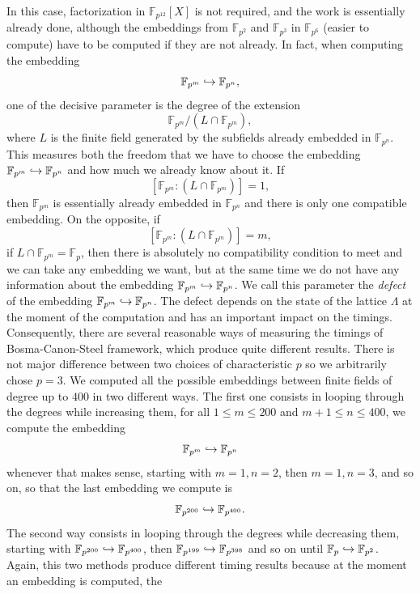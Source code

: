 In this case, factorization in $\mathbb{F}_{p^{12}}[X]$ is not required, and the
work is essentially already done, although the embeddings from
$\mathbb{F}_{p^{2}}$ and $\mathbb{F}_{p^{3}}$ in $\mathbb{F}_{p^{6}}$ (easier
to compute) have to be computed if they are not already.
In fact, when computing the embedding
\[
  \mathbb{F}_{p^{m}}\hookrightarrow\mathbb{F}_{p^{n}},
\]
one of the decisive parameter is the degree of the extension 
\[
  \mathbb{F}_{p^{m}}/(L\cap\mathbb{F}_{p^{m}}),
\]
where $L$ is the finite field generated by the subfields already embedded in
$\mathbb{F}_{p^{n}}$. This measures both the freedom that we have to choose the
embedding $\mathbb{F}_{p^{m}}\hookrightarrow\mathbb{F}_{p^{n}}$ and how much we already
know about it. If
\[
  \left[ \mathbb{F}_{p^{m}}:(L\cap\mathbb{F}_{p^{m}})\right]=1,
\]
then $\mathbb{F}_{p^{m}}$ is essentially already embedded in
$\mathbb{F}_{p^{n}}$ and there is only one compatible embedding. On the
opposite, if 
\[
  \left[ \mathbb{F}_{p^{m}}:(L\cap\mathbb{F}_{p^{m}})\right]=m,
\]
\ie if $L\cap\mathbb{F}_{p^{m}}=\mathbb{F}_p$, then there is absolutely no
compatibility condition to meet and we can take any embedding we want, but at
the same time we do not have any information about the embedding
$\mathbb{F}_{p^{m}}\hookrightarrow\mathbb{F}_{p^{n}}$. We call this parameter the
\emph{defect} of the embedding $\mathbb{F}_{p^{m}}\hookrightarrow\mathbb{F}_{p^{n}}$.
The defect depends on the state of the lattice $\Lambda$ at the moment of the
computation and has an important impact on the timings.
Consequently, there are several reasonable ways of measuring the timings
of Bosma-Canon-Steel framework, which produce quite different results.
There is not major difference between two choices of characteristic $p$ so we
arbitrarily chose $p=3$. We
computed all the possible embeddings between finite fields of degree up to $400$
in two different ways. The first one consists in looping through the degrees
while increasing them, \ie for all $1\leq m\leq200$ and $m+1 \leq n\leq 400$, we
compute the embedding 
\[
  \mathbb{F}_{p^{m}}\hookrightarrow \mathbb{F}_{p^{n}}
\]
whenever that makes sense, starting with $m=1, n=2$, then $m=1, n=3$, and so on, so
that the last embedding we compute is 
\[
  \mathbb{F}_{p^{200}}\hookrightarrow\mathbb{F}_{p^{400}}.
\]
The second way consists in looping through the
degrees while decreasing them, \ie starting with
$\mathbb{F}_{p^{200}}\hookrightarrow\mathbb{F}_{p^{400}}$, then
$\mathbb{F}_{p^{199}}\hookrightarrow\mathbb{F}_{p^{398}}$ and so on until
$\mathbb{F}_{p}\hookrightarrow\mathbb{F}_{p^{2}}$. Again, this two methods produce
different timing results because at the moment an embedding is computed, the

